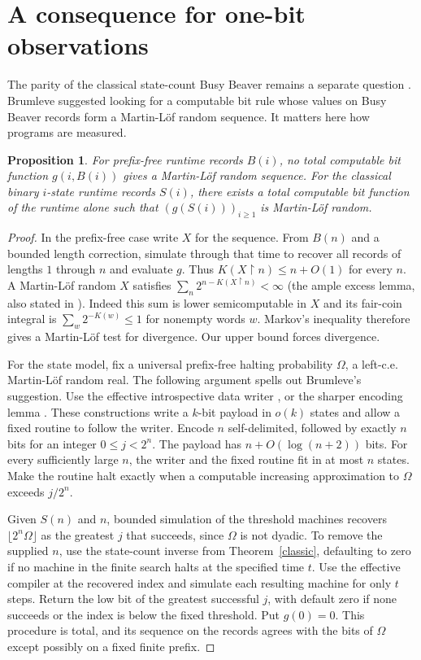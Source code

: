 \documentclass[11pt]{article}
\newtheorem{proposition}[theorem]{Proposition}
\begin{document}
\section*{A consequence for one-bit observations}
The parity of the classical state-count Busy Beaver remains a separate question \cite[Section 5.11]{aaronson}. Brumleve \cite{brumleve} suggested looking for a computable bit rule whose values on Busy Beaver records form a Martin-L\"of random sequence. It matters here how programs are measured.

\begin{proposition}
For prefix-free runtime records $B(i)$, no total computable bit function $g(i,B(i))$ gives a Martin-L\"of random sequence. For the classical binary $i$-state runtime records $S(i)$, there exists a total computable bit function of the runtime alone such that $(g(S(i)))_{i\ge1}$ is Martin-L\"of random.
\end{proposition}
\begin{proof}
In the prefix-free case write $X$ for the sequence. From $B(n)$ and a bounded length correction, simulate through that time to recover all records of lengths $1$ through $n$ and evaluate $g$. Thus $K(X{\upharpoonright}n)\le n+O(1)$ for every $n$. A Martin-L\"of random $X$ satisfies $\sum_n2^{n-K(X{\upharpoonright}n)}<\infty$ (the ample excess lemma, also stated in \cite[Theorem 3.10]{tadaki}). Indeed this sum is lower semicomputable in $X$ and its fair-coin integral is $\sum_w 2^{-K(w)}\le1$ for nonempty words $w$. Markov's inequality therefore gives a Martin-L\"of test for divergence. Our upper bound forces divergence.

For the state model, fix a universal prefix-free halting probability $\Omega$, a left-c.e. Martin-L\"of random real. The following argument spells out Brumleve's suggestion. Use the effective introspective data writer \cite[Section 8.3.2]{ya}, or the sharper encoding lemma \cite[Lemma 17]{aaronson}. These constructions write a $k$-bit payload in $o(k)$ states and allow a fixed routine to follow the writer. Encode $n$ self-delimited, followed by exactly $n$ bits for an integer $0\le j<2^n$. The payload has $n+O(\log(n+2))$ bits. For every sufficiently large $n$, the writer and the fixed routine fit in at most $n$ states. Make the routine halt exactly when a computable increasing approximation to $\Omega$ exceeds $j/2^n$.

Given $S(n)$ and $n$, bounded simulation of the threshold machines recovers $\lfloor 2^n\Omega\rfloor$ as the greatest $j$ that succeeds, since $\Omega$ is not dyadic. To remove the supplied $n$, use the state-count inverse from Theorem~\ref{classic}, defaulting to zero if no machine in the finite search halts at the specified time $t$. Use the effective compiler at the recovered index and simulate each resulting machine for only $t$ steps. Return the low bit of the greatest successful $j$, with default zero if none succeeds or the index is below the fixed threshold. Put $g(0)=0$. This procedure is total, and its sequence on the records agrees with the bits of $\Omega$ except possibly on a fixed finite prefix.
\end{proof}
\end{document}
